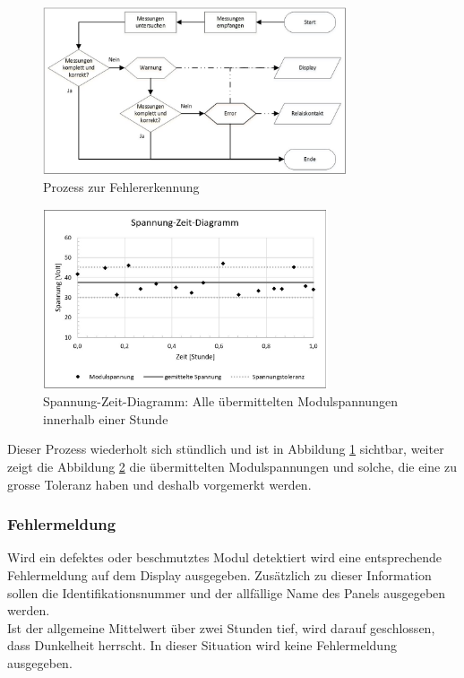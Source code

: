 \begin{figure}[htbp] 
  \centering
     \includegraphics[width=0.8\textwidth]{graphics/error-warning-scheme}
  \caption{Prozess zur Fehlererkennung}
  \label{fig:error-warning-scheme}
\end{figure}

\begin{figure}[htbp] 
  \centering
     \includegraphics[width=0.75\textwidth]{graphics/failurecalc-diagram}
  \caption{Spannung-Zeit-Diagramm: Alle übermittelten Modulspannungen innerhalb einer Stunde}
  \label{fig:failurecalc-diagram}
\end{figure}

Dieser Prozess wiederholt sich stündlich und ist in Abbildung \ref{fig:error-warning-scheme} sichtbar, weiter zeigt die Abbildung \ref{fig:failurecalc-diagram} die übermittelten Modulspannungen und solche, die eine zu grosse Toleranz haben und deshalb vorgemerkt werden.

\subsubsection{Fehlermeldung}
Wird ein defektes oder beschmutztes Modul detektiert wird eine entsprechende Fehlermeldung auf dem Display ausgegeben. Zusätzlich zu dieser Information sollen die Identifikationsnummer und der allfällige Name des Panels ausgegeben werden.\\
Ist der allgemeine Mittelwert über zwei Stunden tief, wird darauf geschlossen, dass Dunkelheit herrscht. In dieser Situation wird keine Fehlermeldung ausgegeben.

